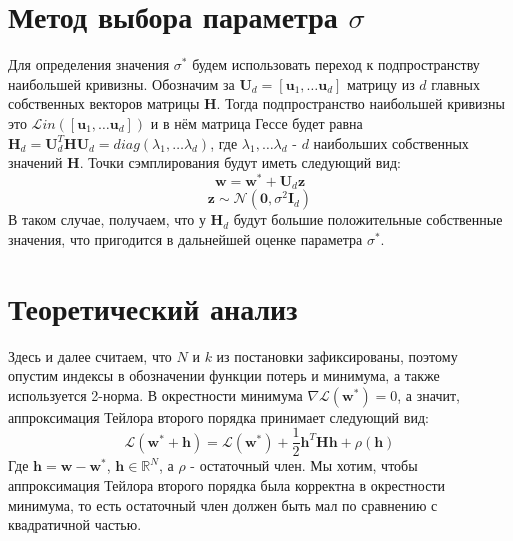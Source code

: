 \documentclass[11pt,a4paper]{article}
\begin{document}
\section{Метод выбора параметра $\sigma$}
Для определения значения $\sigma^*$ будем использовать переход к подпространству наибольшей кривизны. Обозначим за $\mathbf{U}_d = [\mathbf{u}_1, \dots\mathbf{u}_d]$ матрицу из $d$ главных собственных векторов матрицы $\mathbf{H}$. Тогда подпространство наибольшей кривизны это $\mathcal{L}in([\mathbf{u}_1, \dots\mathbf{u}_d])$ и в нём матрица Гессе будет равна $\mathbf{H}_d = \mathbf{U}_d^T\mathbf{H}\mathbf{U}_d = diag(\lambda_1, \dots \lambda_d)$, где $\lambda_1, \dots \lambda_d$ - $d$ наибольших собственных значений $\mathbf{H}$. \newline
Точки сэмплирования будут иметь следующий вид:
$$\mathbf{w} = \mathbf{w}^{*} + \mathbf{U}_d \mathbf{z}$$ 
$$\mathbf{z} \sim \mathcal{N}(\mathbf{0}, \sigma^2 \mathbf{I}_d)$$
В таком случае, получаем, что у $\mathbf{H}_d$ будут большие положительные собственные значения, что пригодится в дальнейшей оценке параметра $\sigma^*$.
\section{Теоретический анализ}
Здесь и далее считаем, что $N$ и $k$ из постановки зафиксированы, поэтому опустим индексы в обозначении функции потерь и минимума, а также используется 2-норма. \newline
В окрестности минимума $\nabla\mathcal{L}(\mathbf{w}^*) = 0$, а значит, аппроксимация Тейлора второго порядка принимает следующий вид:
$$\mathcal{L}(\mathbf{w}^* + \mathbf{h}) = \mathcal{L}(\mathbf{w}^*)+\frac{1}{2}\mathbf{h}^T\mathbf{H}\mathbf{h}+\rho(\mathbf{h})$$
Где $\mathbf{h} = \mathbf{w} - \mathbf{w}^*$, $\mathbf{h}\in \mathbb{R}^N$, а $\rho$ - остаточный член. \newline
Мы хотим, чтобы аппроксимация Тейлора второго порядка была корректна в окрестности минимума, то есть остаточный член должен быть мал по сравнению с квадратичной частью. \newline
\end{document}
